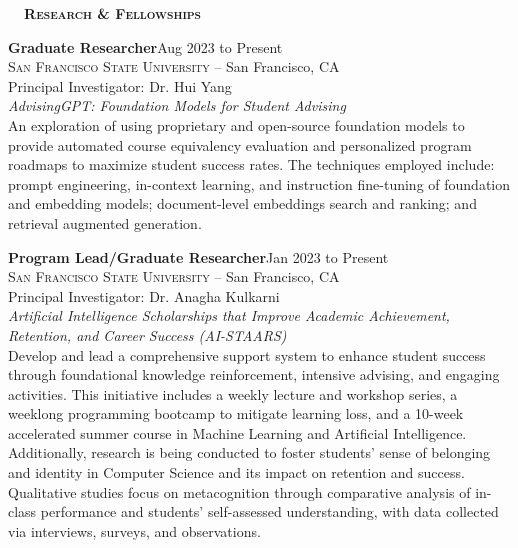 \documentclass[hidelinks, 10pt]{article}
\def\contentspacing{2.5mm}          %
\def\sectionspacing{6mm}            %
\def\sectiontocontentspacing{4mm}   %
\renewcommand{\section}[1]{
    {\fontsize{14}{14}\selectfont \textsc{\textbf{\ \ #1\ \ }}}\hrulefill
}
\begin{document}
{\vspace{\sectionspacing}


\section{Research \& Fellowships}

\vspace{\sectiontocontentspacing}

\begin{minipage}[ct]{0.9\linewidth}
    \textbf{Graduate Researcher}\hfill Aug 2023 to Present\\
    \textsc{San Francisco State University} -- San Francisco, CA\\
    Principal Investigator: Dr. Hui Yang\vspace{1mm}\\
    {\textit{AdvisingGPT: Foundation Models for Student Advising}}\\
    An exploration of using proprietary and open-source foundation models to provide automated course equivalency evaluation and
    personalized program roadmaps to maximize student success rates. The techniques employed include: prompt engineering, in-context
    learning, and instruction fine-tuning of foundation and embedding models; document-level embeddings search and ranking; and
    retrieval augmented generation.
\end{minipage}

\vspace{\contentspacing}

\begin{minipage}[ct]{0.9\linewidth}
    \textbf{Program Lead/Graduate Researcher}\hfill Jan 2023 to Present\\
    \textsc{San Francisco State University} -- San Francisco, CA\\
    Principal Investigator: Dr. Anagha Kulkarni\vspace{1mm}\\
    {\textit{Artificial Intelligence Scholarships that Improve Academic Achievement, Retention, and Career Success (AI-STAARS)}}\\
    Develop and lead a comprehensive support system to enhance student success through foundational knowledge reinforcement, intensive
    advising, and engaging activities. This initiative includes a weekly lecture and workshop series, a weeklong programming bootcamp to
    mitigate learning loss, and a 10-week accelerated summer course in Machine Learning and Artificial Intelligence. Additionally, research
    is being conducted to foster students' sense of belonging and identity in Computer Science and its impact on retention and success.
    Qualitative studies focus on metacognition through comparative analysis of in-class performance and students' self-assessed
    understanding, with data collected via interviews, surveys, and observations.
\end{minipage}

}
\end{document}
